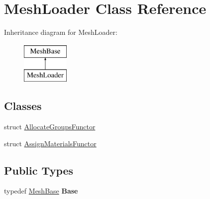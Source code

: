 \hypertarget{class_mesh_loader}{}\section{Mesh\+Loader Class Reference}
\label{class_mesh_loader}
Inheritance diagram for Mesh\+Loader\+:\begin{figure}[H]
\begin{center}
\leavevmode
\includegraphics[height=2.000000cm]{class_mesh_loader}
\end{center}
\end{figure}
\subsection*{Classes}
\begin{DoxyCompactItemize}
\item 
struct \hyperlink{struct_mesh_loader_1_1_allocate_groups_functor}{Allocate\+Groups\+Functor}
\item 
struct \hyperlink{struct_mesh_loader_1_1_assign_materials_functor}{Assign\+Materials\+Functor}
\end{DoxyCompactItemize}
\subsection*{Public Types}
\begin{DoxyCompactItemize}
\item 
\mbox{\label{class_mesh_loader_a0873ba1926f051adc9bbc6afab1ed4de}} 
typedef \hyperlink{class_mesh_base}{Mesh\+Base} {\bfseries Base}
\end{DoxyCompactItemize}
